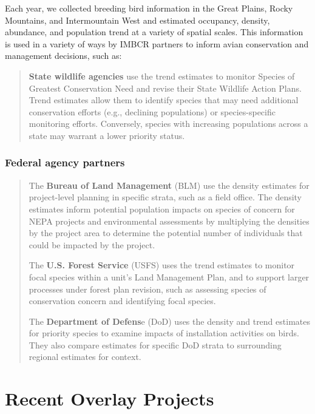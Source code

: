 \documentclass[
  letterpaper,
  DIV=11,
  numbers=noendperiod,
  oneside]{scrreprt}
\begin{document}
Each year, we collected breeding bird information in the Great Plains,
Rocky Mountains, and Intermountain West and estimated occupancy,
density, abundance, and population trend at a variety of spatial scales.
This information is used in a variety of ways by IMBCR partners to
inform avian conservation and management decisions, such as:

\begin{quote}
\textbf{State wildlife agencies} use the trend estimates to monitor
Species of Greatest Conservation Need and revise their State Wildlife
Action Plans. Trend estimates allow them to identify species that may
need additional conservation efforts (e.g., declining populations) or
species-specific monitoring efforts. Conversely, species with increasing
populations across a state may warrant a lower priority status.
\end{quote}

\hypertarget{federal-agency-partners}{%
\subsubsection{Federal agency partners}\label{federal-agency-partners}}

\begin{quote}
The \textbf{Bureau of Land Management} (BLM) use the density estimates
for project-level planning in specific strata, such as a field office.
The density estimates inform potential population impacts on species of
concern for NEPA projects and environmental assessments by multiplying
the densities by the project area to determine the potential number of
individuals that could be impacted by the project.

The \textbf{U.S. Forest Service} (USFS) uses the trend estimates to
monitor focal species within a unit's Land Management Plan, and to
support larger processes under forest plan revision, such as assessing
species of conservation concern and identifying focal species.

The \textbf{Department of Defens}e (DoD) uses the density and trend
estimates for priority species to examine impacts of installation
activities on birds. They also compare estimates for specific DoD strata
to surrounding regional estimates for context.
\end{quote}

\hypertarget{recent-overlay-projects}{%
\section{Recent Overlay Projects}\label{recent-overlay-projects}}
\end{document}
